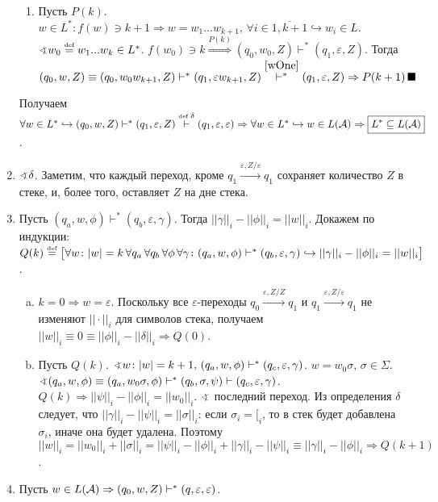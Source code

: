 \documentclass[a4paper]{article}
\def\A{{\cal A}}
\def\eqdef{\overset{\mbox{\tiny def}}{=}}
\begin{document}
\begin{enumerate}
\begin{enumerate}
\item Пусть $P(k)$. $w\in L^*\colon f(w)\ni k+1\Rightarrow w=w_1...w_{k+1},\,\forall i\in\overline{1,k+1}\hookrightarrow w_i\in L$. $\varangle w_0\eqdef w_1...w_k\in L^*$. $f(w_0)\ni k\overset{P(k)}{\Rightarrow} (q_0,w_0,Z)\vdash^*(q_1,\varepsilon,Z)$. Тогда $(q_0,w,Z)\equiv(q_0,w_0w_{k+1},Z)\vdash^*(q_1,\varepsilon w_{k+1},Z)\overset{\ref{wOne}}{\vdash^*}(q_1,\varepsilon,Z)\Rightarrow P(k+1)\,\blacksquare$
\end{enumerate}
Получаем $\forall w\in L^*\hookrightarrow (q_0,w,Z)\vdash^*(q_1,\varepsilon,Z)\overset{\mbox{\tiny def }\delta}{\vdash}(q_1,\varepsilon,\varepsilon)\Rightarrow \forall w\in L^*\hookrightarrow w\in L(\A)\Rightarrow \boxed{L^*\subseteq L(\A)}$.
\item \label{bottom} $\varangle\delta$. Заметим, что каждый переход, кроме $q_1\overset{\varepsilon
,Z/\varepsilon}{\longrightarrow}q_1$ сохраняет количество $Z$ в стеке, и, более того, оставляет $Z$ на дне стека.
\item \label{normAndAutomata} Пусть $(q_a,w,\phi)\vdash^*(q_b,\varepsilon,\gamma)$. Тогда $||\gamma||_i-||\phi||_i=||w||_i$. Докажем по индукции:\newline
$Q(k)\eqdef\big[\forall w\colon |w|=k\,\forall q_a\,\forall q_b\,\forall\phi\,\forall\gamma\colon (q_a,w,\phi)\vdash^*(q_b,\varepsilon,\gamma)\hookrightarrow ||\gamma||_i-||\phi||_i=||w||_i\big]$.\begin{enumerate}[a.]
\item $k=0\Rightarrow w=\varepsilon$. Поскольку все $\varepsilon$-переходы $q_0\overset{\varepsilon,Z/Z}{\longrightarrow}q_1$ и $q_1\overset{\varepsilon,Z/\varepsilon}{\longrightarrow}q_1$ не изменяют $||\cdot||_i$ для символов стека, получаем $||w||_i\equiv 0\equiv ||\phi||_i-||\delta||_i\Rightarrow Q(0)$.
\item Пусть $Q(k)$. $\varangle w\colon |w|=k+1,\,(q_a,w,\phi)\vdash^*(q_c,\varepsilon,\gamma)$. $w=w_0\sigma$, $\sigma\in\Sigma$. $\varangle (q_a,w,\phi)\equiv(q_a,w_0\sigma,\phi)\vdash^*(q_b,\sigma,\psi)\vdash(q_c,\varepsilon,\gamma)$. $Q(k)\Rightarrow ||\psi||_i-||\phi||_i=||w_0||_i$. $\varangle$ последний переход. Из определения $\delta$ следует, что $||\gamma||_i-||\psi||_i=||\sigma||_i$: если $\sigma_i=[_i$, то в стек будет добавлена $\sigma_i$, иначе она будет удалена. Поэтому $||w||_i=||w_0||_i+||\sigma||_i=||\psi||_i-||\phi||_i+||\gamma||_i-||\psi||_i\equiv||\gamma||_i-||\phi||_i\Rightarrow Q(k+1)$.
\end{enumerate}
\item Пусть $w\in L(\A)\Rightarrow(q_0,w,Z)\vdash^*(q,\varepsilon,\varepsilon)$.

\end{enumerate}
\end{document}
